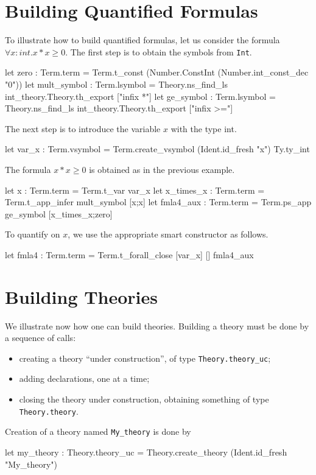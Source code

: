 \section{Building Quantified Formulas}

To illustrate how to build quantified formulas, let us consider
the formula $\forall x:int. x*x \geq 0$. The first step is to
obtain the symbols from \texttt{Int}.
\begin{ocamlcode}
let zero : Term.term =
  Term.t_const (Number.ConstInt (Number.int_const_dec "0"))
let mult_symbol : Term.lsymbol =
  Theory.ns_find_ls int_theory.Theory.th_export ["infix *"]
let ge_symbol : Term.lsymbol =
  Theory.ns_find_ls int_theory.Theory.th_export ["infix >="]
\end{ocamlcode}
The next step is to introduce the variable $x$ with the type int.
\begin{ocamlcode}
let var_x : Term.vsymbol =
  Term.create_vsymbol (Ident.id_fresh "x") Ty.ty_int
\end{ocamlcode}
The formula $x*x \geq 0$ is obtained as in the previous example.
\begin{ocamlcode}
let x : Term.term = Term.t_var var_x
let x_times_x : Term.term = Term.t_app_infer mult_symbol [x;x]
let fmla4_aux : Term.term = Term.ps_app ge_symbol [x_times_x;zero]
\end{ocamlcode}
To quantify on $x$, we use the appropriate smart constructor as follows.
\begin{ocamlcode}
let fmla4 : Term.term = Term.t_forall_close [var_x] [] fmla4_aux
\end{ocamlcode}

\section{Building Theories}

We illustrate now how one can build theories. Building a theory must
be done by a sequence of calls:
\begin{itemize}
\item creating a theory ``under construction'', of type \verb|Theory.theory_uc|;
\item adding declarations, one at a time;
\item closing the theory under construction, obtaining something of type \verb|Theory.theory|.
\end{itemize}

Creation of a theory named \verb|My_theory| is done by
\begin{ocamlcode}
let my_theory : Theory.theory_uc =
  Theory.create_theory (Ident.id_fresh "My_theory")
\end{ocamlcode}

